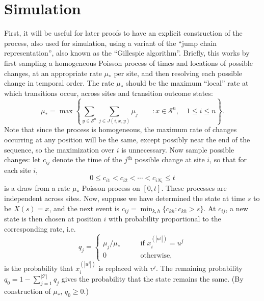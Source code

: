 \documentclass{article}
\newcommand{\erick}[1]{\todo[color=purple!40]{Erick: #1}}
\newcommand{\calS}{\mathcal{S}}  %
\newcommand{\calT}{\mathcal{T}}  %
\newcommand{\st}{\colon}  %
\theoremstyle{plain}
\theoremstyle{definition}
\begin{document}
\section{Simulation}

First, it will be useful for later proofs to have an explicit construction of the process,
also used for simulation,
using a variant of the ``jump chain representation'', also known as the ``Gillespie algorithm''.
Briefly, this  works by first sampling a homogeneous Poisson process of times and locations of possible changes,
at an appropriate rate $\mu_*$ per site,
and then resolving each possible change in temporal order.
The rate $\mu_*$ should be the maximum ``local'' rate at which transitions occur, across sites and transition outcome states:
\[
\mu_* = \max \left\{ \sum_{y \in \calS^n} \sum_{j\in J(i,x,y)} \mu_j \qquad \st x \in \calS^n, \quad 1 \le i \le n \right\} .
\]
Note that since the process is homogeneous, the maximum rate of changes occurring at any position will be the same, except possibly near the end of the sequence,
so the maximization over $i$ is unnecessary.
Now sample possible changes: let $c_{ij}$ denote the time of the $j^\text{th}$ possible change at site $i$,
so that for each site $i$,
\[
0 \le c_{i1} < c_{i2} < \cdots < c_{iN_i} \le t
\]
is a draw from a rate $\mu_*$ Poisson process on $[0,t]$.
These processes are independent across sites.
Now, suppose we have determined the state at time $s$ to be $X(s) = x$,
and the next event is $c_{ij} = \min_{k,h} \{ c_{kh} : c_{kh}>s \}$.
At $c_{ij}$,
a new state is then chosen at position $i$
with probability proportional to the corresponding rate, i.e.\
\[
q_j = \begin{cases}
  \mu_j/\mu_* \qquad & \text{if } x_i^{(|u^j|)} = u^j  \\
  0 \qquad & \text{otherwise,}
\end{cases}
\]
is the probability that $x_i^{(|u^j|)}$ is replaced with $v^j$.
The remaining probability $q_0 = 1-\sum_{j=1}^{|\calT|} q_j$ gives the probability that the state remains the same.
(By construction of $\mu_*$, $q_0\ge 0$.)
\end{document}
